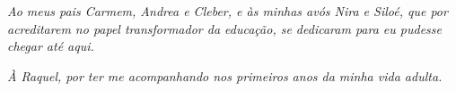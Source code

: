 \begin{dedicatoria}
   \vspace*{\fill}
   \centering
   \noindent
      
   \textit{Ao meus pais Carmem, Andrea e Cleber, e às minhas avós Nira e Siloé, que por acreditarem no papel transformador da educação, se dedicaram para eu pudesse chegar até aqui.
   } 
   
   \textit{À Raquel, por ter me acompanhando nos primeiros anos da minha vida adulta.}   

   \vspace*{\fill}
\end{dedicatoria}

